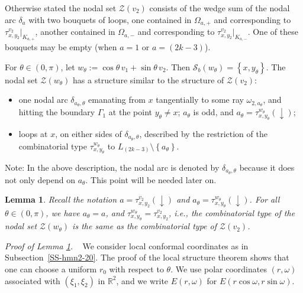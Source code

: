 \documentclass[12pt,a4paper]{amsart}
\theoremstyle{plain} %
\newtheorem{lemma}[theorem]{Lemma}
\theoremstyle{definition}
\numberwithin{equation}{section}
\numberwithin{figure}{section}
\numberwithin{table}{section}
\newcommand{\R}{\mathbb{R}}
\newcommand{\cS}{\mathcal{S}}
\newcommand{\cZ}{\mathcal{Z}}
\newcommand{\sm}{\!\setminus\!}
\newcommand{\set}[1]{\left\lbrace #1 \right\rbrace}
\begin{document}
{Otherwise stated the nodal set $\cZ(v_2)$ consists of the wedge sum of the nodal arc $\delta_a$ with two bouquets of loops, one contained in $\Omega_{a,+}$ and corresponding to $ \tau_{x,y_2}^{v_2}|_{K_{a,+}}$,  another contained in $\Omega_{a,-}$ and corresponding to $ \tau_{x,y_2}^{v_2}|_{K_{a,-}}$. One of these bouquets may be empty (when $a=1$ or $a=(2k-3)$).\medskip



For $\theta \in (0,\pi)$,  let $w_{\theta} := \cos\theta \, v_1 + \sin\theta \, v_2$.  Then $\cS_b(w_{\theta}) = \set{x,y_{\theta}}$. The nodal set $\cZ(w_{\theta})$ has a structure similar to the structure of $\cZ(v_2)$:
\begin{itemize}
\item[$\diamond$] one nodal arc $\delta_{a_{\theta},\theta}$ emanating from $x$ tangentially to some ray $\omega_{2,a_{\theta}}$, and hitting the boundary $\Gamma_1$ at the point $y_{\theta} \not = x$; $a_{\theta}$ is odd, and $a_{\theta} = \tau_{x,y_{\theta}}^{w_{\theta}}(\downarrow)$;
\item[$\diamond$]  loops at $x$, on either sides of $\delta_{a_{\theta},\theta}$, described by the restriction of the combinatorial type $\tau_{x,y_{\theta}}^{w_{\theta}}$ to $L_{(2k-3)} \sm \set{a_{\theta}}$.
\end{itemize}

Note:  In the above description, the nodal arc is denoted by $\delta_{a_{\theta},\theta}$ because it does not only depend on $a_{\theta}$. This point will be needed later on.


\begin{lemma}\label{L-hmn-202} Recall the notation $a = \tau_{x,y_{2}}^{v_2}(\downarrow)$ and $a_{\theta} = \tau_{x,y_{\theta}}^{w_{\theta}}(\downarrow)$.
For all $\theta \in (0,\pi)$, we have $a_{\theta} = a$, and $\tau_{x,y_{\theta}}^{w_{\theta}} = \tau_{x,y_2}^{v_2}$, i.e., the  combinatorial type of the nodal set $\cZ(w_{\theta})$ is the same as the combinatorial type of $\cZ(v_2)$.
\end{lemma}%

\emph{Proof of Lemma \ref{L-hmn-202}.} ~ We consider local conformal coordinates as in Subsection~\ref{SS-hmn2-20}. The proof of the local structure theorem shows that one can choose a uniform $r_0$ with respect to $\theta$. We use polar coordinates $(r,\omega)$ associated with $(\xi_1,\xi_2)$ in $\R^2$, and we write $E(r,\omega)$ for $E(r\cos\omega,r\sin\omega)$.\smallskip

}
\end{document}
